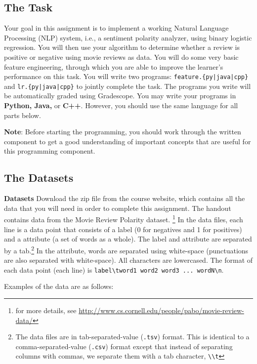 \documentclass[11pt,addpoints,answers]{exam}
\begin{document}
\subsection{The Task}\label{task}

Your goal in this assignment is to implement a working Natural Language Processing (NLP) system, i.e., a sentiment polarity analyzer, using binary logistic regression. You will then use your algorithm to determine whether a review is positive or negative using movie reviews as data. You will do some very basic feature engineering, through which you are able to improve the learner's performance on this task. You will write two programs: \texttt{feature.\{py|java|cpp\}} and \texttt{lr.\{py|java|cpp\}} to jointly complete the task. The programs you write will be automatically graded using Gradescope. You may write your programs in {\bf Python, Java,} or {\bf C++}. However, you should use the same language for all parts below.

\textbf{Note}: Before starting the programming, you should work through the written component to get a good understanding of important concepts that are useful for this programming component. 

\subsection{The Datasets}\label{dataset}


  {\bf Datasets } 
 Download the zip file from the course website, which contains all the data that you will need in order to complete this assignment.
  The handout contains data from the Movie Review Polarity dataset. \footnote{for more details, see \url{http://www.cs.cornell.edu/people/pabo/movie-review-data/}} In the data files, each line is a data point that consists of a label (0 for negatives and 1 for positives) and a attribute (a set of words as a whole). The label and attribute are separated by a tab.\footnote{The data files are in tab-separated-value (\lstinline{.tsv}) format. This is identical to a comma-separated-value (\lstinline{.csv}) format except that instead of separating columns with commas, we separate them with a tab character, \lstinline{\\t}} In the attribute, words are separated using white-space (punctuations are also separated with white-space). All characters are lowercased. The format of each data point (each line) is \lstinline{label\tword1 word2 word3 ... wordN\n}.

Examples of the data are as follows:
 
\end{document}
